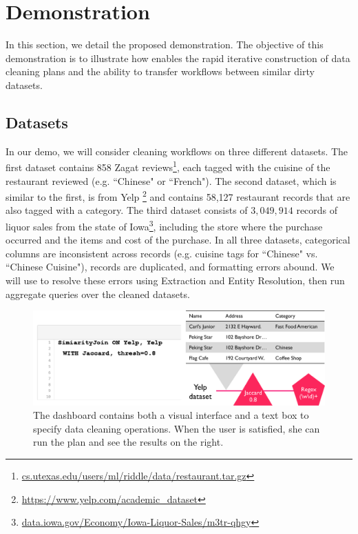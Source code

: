 \section{Demonstration}
In this section, we detail the proposed demonstration.
The objective of this demonstration is to illustrate 
how \sys enables the rapid iterative construction of data cleaning plans
and the ability to transfer workflows between similar dirty datasets.

\subsection{Datasets}
In our demo, we will consider cleaning workflows on three different datasets.
The first dataset contains 858 Zagat reviews\footnote{\scriptsize{ \url{cs.utexas.edu/users/ml/riddle/data/restaurant.tar.gz}}},
each tagged with the cuisine of the restaurant reviewed (e.g. ``Chinese" or ``French").
The second dataset, which is similar to the first, is from Yelp \footnote{\scriptsize{\url{https://www.yelp.com/academic_dataset}}} and contains 58,127 restaurant records that are also tagged with a category.
The third dataset consists of $3,049,914$ records of liquor sales from the state of Iowa\footnote{\scriptsize{\url{data.iowa.gov/Economy/Iowa-Liquor-Sales/m3tr-qhgy}}}, including the store where the purchase occurred and the items and cost of the purchase.
In all three datasets, categorical columns are inconsistent across records (e.g. cuisine tags for ``Chinese" vs. ``Chinese Cuisine"), records are duplicated, and formatting errors abound. 
We will use \sys to resolve these errors using Extraction and Entity Resolution, then run aggregate queries over the cleaned datasets.

\begin{figure}[t]
\centering
 \includegraphics[width=\columnwidth]{figs/dashboard_screenshot.png}
 \caption{The dashboard contains both a visual interface and a text box to specify data cleaning operations. When the user is satisfied, she can run the plan and see the results on the right. \label{screenshot}}
\end{figure}


